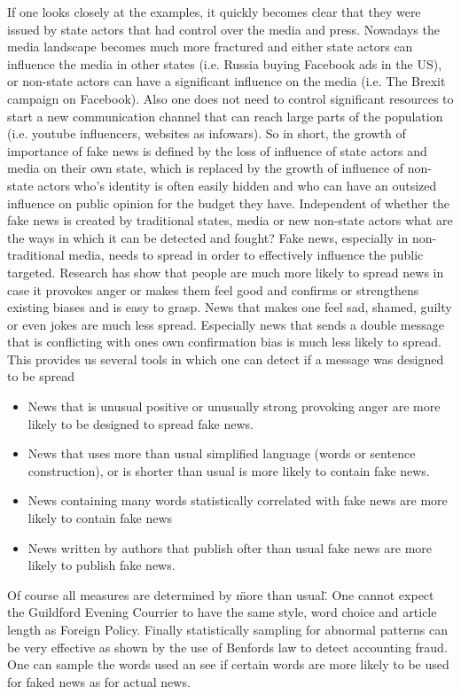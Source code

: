 \documentclass[10pt, a4paper, twocolumn]{article} %
\begin{document}
If one looks closely at the examples, it quickly becomes clear that they were issued by state actors that had control over the media and press. Nowadays the media landscape becomes much more fractured and either state actors can influence the media in other states (i.e. Russia buying Facebook ads in the US), or non-state actors can have a significant influence on the media (i.e. The Brexit campaign on Facebook). Also one does not need to control significant resources to start a new communication channel that can reach large parts of the population (i.e. youtube influencers, websites as infowars). So in short, the growth of importance of fake news is defined by the loss of influence of state actors and media on their own state, which is replaced by the growth of influence of non-state actors who's identity is often easily hidden and who can have an outsized influence on public opinion for the budget they have.
Independent of whether the fake news is created by traditional states, media or new non-state actors what are the ways in which it can be detected and fought? Fake news, especially in non-traditional media, needs to spread in order to effectively influence the public targeted. Research has show that people are much more likely to spread news in case it provokes anger or makes them feel good and confirms or strengthens existing biases and is easy to grasp. News that makes one feel sad, shamed, guilty or even jokes are much less spread. Especially news that sends a double message that is conflicting with ones own confirmation bias is much less likely to spread. This provides us several tools in which one can detect if a message was designed to be spread
\begin{itemize}
\item News that is unusual positive or unusually strong provoking anger are more likely to be designed to spread fake news.
\item News that uses more than usual simplified language (words or sentence construction), or is shorter than usual is more likely to contain fake news.
\item News containing many words statistically correlated with fake news are more likely to contain fake news
\item News written by authors that publish ofter than usual fake news are more likely to publish fake news.
\end{itemize}
Of course all measures are determined by \"more than usual\". One cannot expect the Guildford Evening Courrier\cite{adams1979} to have the same style, word choice and article length as Foreign Policy.
Finally statistically sampling for abnormal patterns can be very effective as shown by the use of Benfords law to detect accounting fraud. One can sample the words used an see if certain words are more likely to be used for faked news as for actual news.
\end{document}
